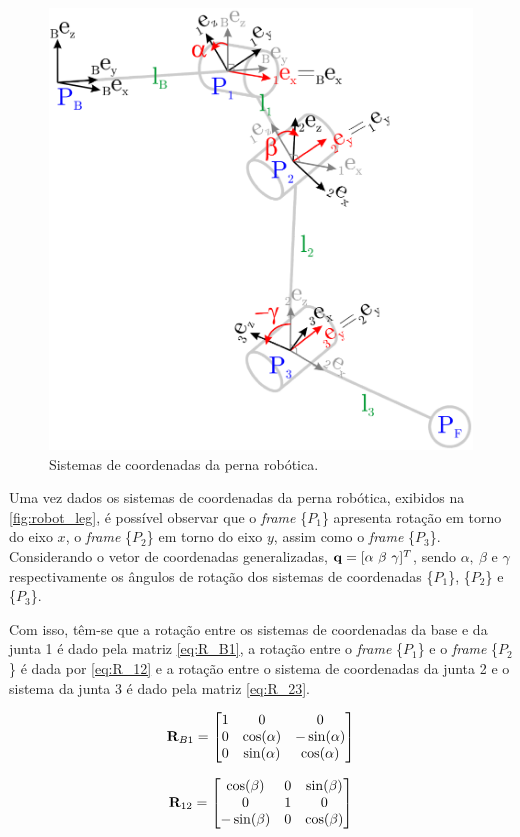 \section{}

\begin{figure}[H]
	\centering
	\includegraphics[width=0.5\linewidth]{img/robot_leg}
	\caption{Sistemas de coordenadas da perna robótica.}
	\label{fig:robot_leg}
\end{figure}

Uma vez dados os sistemas de coordenadas da perna robótica, exibidos na \autoref{fig:robot_leg}, é possível observar que o \textit{frame} \{$P_1$\} apresenta rotação em torno do eixo $x$, o \textit{frame} \{$P_2$\} em torno do eixo $y$, assim como o \textit{frame} \{$P_3$\}. Considerando o vetor de coordenadas generalizadas, $\mathbf{q} = [\alpha \ \beta \ \gamma]^T$, sendo $\alpha, \ \beta $ e $\gamma$ respectivamente os ângulos de rotação dos sistemas de coordenadas \{$P_1$\}, \{$P_2$\} e \{$P_3$\}.

Com isso, têm-se que a rotação entre os sistemas de coordenadas da base e da junta 1 é dado pela matriz \eqref{eq:R_B1}, a rotação entre o \textit{frame} \{$P_1$\} e o \textit{frame} \{$P_2$\} é dada por \eqref{eq:R_12} e a rotação entre o sistema de coordenadas da junta 2 e o sistema da junta 3 é dado pela matriz \eqref{eq:R_23}.

\begin{equation}\label{eq:R_B1}
	\mathbf{R}_{B1} = \begin{bmatrix}
		1 & 0          & 0 \\
		0 & \cos(\alpha) & -\sin(\alpha) \\
		0 & \sin(\alpha) & \cos(\alpha)
	\end{bmatrix}
\end{equation}

\begin{equation}\label{eq:R_12}
	\mathbf{R}_{12} = \begin{bmatrix}
		\cos(\beta)  & 0  & \sin(\beta) \\
		0          & 1  & 0         \\
		-\sin(\beta) & 0  & \cos(\beta)
	\end{bmatrix}
\end{equation}


